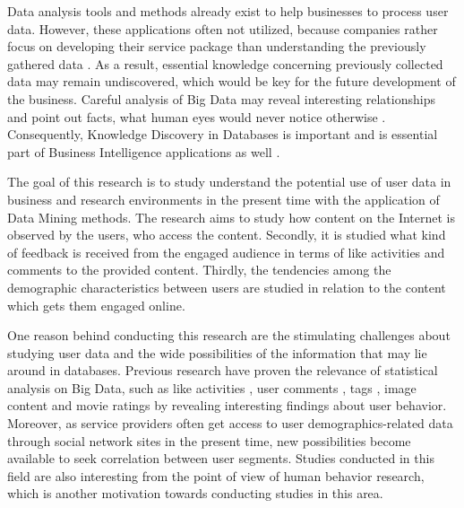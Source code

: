 \documentclass[conference]{IEEEtran}
\begin{document}
 Data analysis tools and methods already exist to help businesses to process user data. However, these applications often not utilized, because companies rather focus on developing their service package than understanding the previously gathered data \cite{inmon2007tapping, bigdatamanagementrevolution}. As a result, essential knowledge concerning previously collected data may remain undiscovered, which would be key for the future development of the business. Careful analysis of Big Data may reveal interesting relationships and point out facts, what human eyes would never notice otherwise \cite{bigdatamanagementrevolution}. Consequently, Knowledge Discovery in Databases is important and is essential part of Business Intelligence applications as well \cite{zarsky2002mine, bigdatamanagementrevolution}.

 The goal of this research is to study understand the potential use of user data in business and research environments in the present time with the application of Data Mining methods. The research aims to study how content on the Internet is observed by the users, who access the content. Secondly, it is studied what kind of feedback is received from the engaged audience in terms of like activities and comments to the provided content. Thirdly, the tendencies among the demographic characteristics between users are studied in relation to the content which gets them engaged online. 

 One reason behind conducting this research are the stimulating challenges about studying user data and the wide possibilities of the information that may lie around in databases. Previous research have proven the relevance of statistical analysis on Big Data, such as like activities \cite{jang2015noreciprocity, jang2016teensengagemorewithfewerphotos, ottoni2013ladies, guy2016whatsyourorganizationlike, jang2015no}, user comments \cite{jang2016teensengagemorewithfewerphotos}, tags \cite{jang2016teensengagemorewithfewerphotos}, image content \cite{hu2014we, bakhshi2014faces} and movie ratings \cite{saraee2004data, kabinsingha2012movie} by revealing interesting findings about user behavior. Moreover, as service providers often get access to user demographics-related data through social network sites in the present time, new possibilities become available to seek correlation between user segments. Studies conducted in this field are also interesting from the point of view of human behavior research, which is another motivation towards conducting studies in this area.
\end{document}
